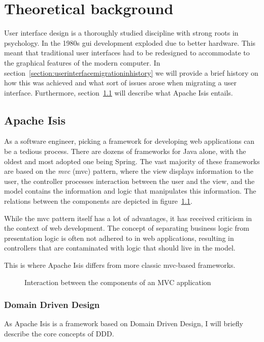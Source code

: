 \chapter{Theoretical background}
\label{chapter:theoreticalbackground}
User interface design is a thoroughly studied discipline with strong roots in psychology. In the 1980s \acrshort{gui} development exploded due to better hardware\cite{myers1998brief}. This meant that traditional user interfaces had to be redesigned to accommodate to the graphical features of the modern computer. In section~\ref{section:userinterfacemigrationinhistory} we will provide a brief history on how this was achieved and what sort of issues arose when migrating a user interface. Furthermore, section~\ref{section:apacheisis} will describe what Apache Isis entails.

\section{Apache Isis}
\label{section:apacheisis}
As a software engineer, picking a framework for developing web applications can be a tedious process. There are dozens of frameworks for Java alone, with the oldest and most adopted one being Spring\cite{Sprin96:online}. The vast majority of these frameworks are based on the \textit{\acrlong{mvc}} (\acrshort{mvc}) pattern, where the view displays information to the user, the controller processes interaction between the user and the view, and the model contains the information and logic that manipulates this information\cite{leff2001web}. The relations between the components are depicted in figure~\ref{figure:mvc}.

While the \acrshort{mvc} pattern itself has a lot of advantages, it has received criticism in the context of web development. The concept of separating business logic from presentation logic is often not adhered to in web applications, resulting in controllers that are contaminated with logic that should live in the model\cite{Fulfi2:online}.

This is where Apache Isis differs from more classic \acrshort{mvc}-based frameworks.

\begin{figure}[h]
	\center
	
	\caption{Interaction between the components of an MVC application}
	\label{figure:mvc}
\end{figure}

\subsection{Domain Driven Design}
\label{subsection:domaindrivendesign}
As Apache Isis is a framework based on Domain Driven Design, I will briefly describe the core concepts of DDD.


